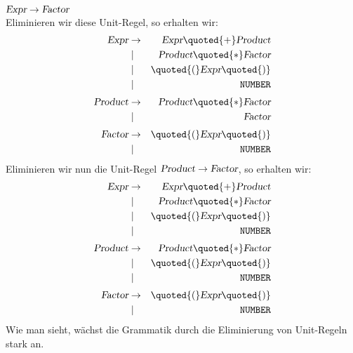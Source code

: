 \hspace*{1.3cm}
$\textsl{Expr} \rightarrow \textsl{Factor}$
\\[0.2cm]
Eliminieren wir diese Unit-Regel, so erhalten wir:
\begin{eqnarray*}
  \textsl{Expr}      & \rightarrow & \textsl{Expr} \quoted{+} \textsl{Product}  \\
                     & \mid        & \textsl{Product} \quoted{*} \textsl{Factor}     \\
                     & \mid        & \quoted{(} \textsl{Expr} \quoted{)}        \\
                     & \mid        & \texttt{NUMBER}                                 \\[0.1cm]
  \textsl{Product}   & \rightarrow & \textsl{Product} \quoted{*} \textsl{Factor}     \\
                     & \mid        & \textsl{Factor}                                 \\[0.1cm]
  \textsl{Factor}    & \rightarrow & \quoted{(} \textsl{Expr} \quoted{)}        \\
                     & \mid        & \texttt{NUMBER} 
\end{eqnarray*}
Eliminieren wir nun die Unit-Regel $\textsl{Product} \rightarrow \textsl{Factor}$, so erhalten wir:
\begin{eqnarray*}
  \textsl{Expr}      & \rightarrow & \textsl{Expr} \quoted{+} \textsl{Product}  \\
                     & \mid        & \textsl{Product} \quoted{*} \textsl{Factor}     \\
                     & \mid        & \quoted{(} \textsl{Expr} \quoted{)}        \\
                     & \mid        & \texttt{NUMBER}                                 \\[0.1cm]
  \textsl{Product}   & \rightarrow & \textsl{Product} \quoted{*} \textsl{Factor}     \\
                     & \mid        & \quoted{(} \textsl{Expr} \quoted{)}        \\
                     & \mid        & \texttt{NUMBER}                                 \\[0.1cm]
  \textsl{Factor}    & \rightarrow & \quoted{(} \textsl{Expr} \quoted{)}        \\
                     & \mid        & \texttt{NUMBER} 
\end{eqnarray*}
Wie man sieht, w\"achst die Grammatik durch die Eliminierung von Unit-Regeln stark an.
